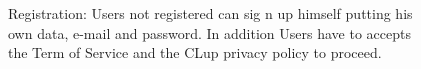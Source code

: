 \begin{figure}[H]
  \caption{Registration: Users not registered can sig n up himself putting his own data, e-mail and password. In addition Users have to accepts the Term of Service and the CLup privacy policy to proceed.}
\end{figure}
